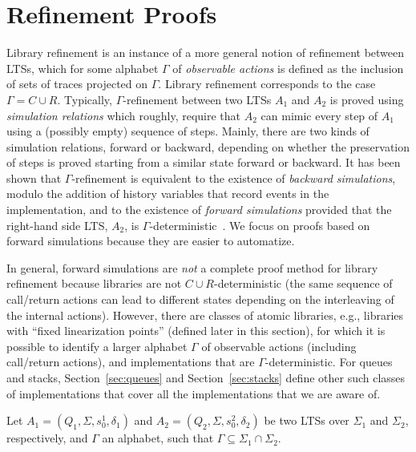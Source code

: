 \vspace{-1mm}
\section{Refinement Proofs}
Library refinement is an instance of a more general notion of refinement between LTSs,
which for some alphabet $\Gamma$ of \emph{observable actions} is defined as the inclusion of sets of 
traces projected on $\Gamma$. Library refinement corresponds to the case $\Gamma=C\cup R$. 
Typically, $\Gamma$-refinement between two LTSs $A_1$ and $A_2$ is proved using \emph{simulation relations} which roughly, require that 
$A_2$ can mimic every step of $A_1$ using a (possibly empty) sequence of steps. Mainly, there are two kinds of simulation
relations, forward or backward, depending on whether the preservation of steps is proved starting from a similar state
forward or backward. It has been shown
that $\Gamma$-refinement is equivalent to the existence of \emph{backward simulations}, modulo the addition of history variables
that record events in the implementation, and to the existence of \emph{forward simulations} provided that the right-hand side
LTS, $A_2$, is $\Gamma$-deterministic~\cite{DBLP:journals/tcs/AbadiL91,DBLP:journals/iandc/LynchV95}. 
We focus on proofs based on forward simulations because they are easier to automatize.


In general, forward simulations are \emph{not} a complete proof method for library refinement because libraries are not 
$C\cup R$-deterministic (the same sequence of call/return actions can lead to different states depending on the interleaving of the internal actions).
However, there are classes of atomic libraries, e.g., libraries with ``fixed linearization points'' (defined later in this section), 
for which it is possible to identify a larger alphabet $\Gamma$ of observable actions (including call/return actions), 
and implementations that are $\Gamma$-deterministic. For queues and stacks, 
Section~\ref{sec:queues} and Section~\ref{sec:stacks} define other such classes of implementations that cover
all the implementations that we are aware of.

Let $A_1=(Q_1,\Sigma, s_0^1, \delta_1)$ and $A_2=(Q_2,\Sigma, s_0^2, \delta_2)$ be two LTSs over $\Sigma_1$ and $\Sigma_2$, respectively, and $\Gamma$ an alphabet, such that $\Gamma\subseteq \Sigma_1\cap\Sigma_2$. 

